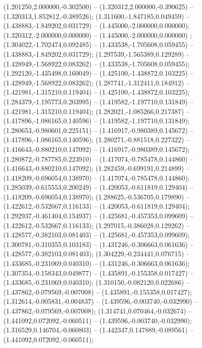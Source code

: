  (1.201250,2.000000,-0.302500) -- (1.320312,2.000000,-0.390625) -- (1.320313,1.852812,-0.389526);
 (1.311600,-1.847185,0.049459) -- (1.438883,-1.849202,0.031729) -- (1.445000,-2.000000,0.000000);
 (1.320312,-2.000000,0.000000) -- (1.445000,-2.000000,0.000000) ;
 (1.304022,-1.702474,0.092485) -- (1.433538,-1.705608,0.059455) -- (1.438883,-1.849202,0.031729);
 (1.297539,-1.565389,0.129289) -- (1.428949,-1.568922,0.083262) -- (1.433538,-1.705608,0.059455);
 (1.292120,-1.435498,0.160049) -- (1.425100,-1.438872,0.103225) -- (1.428949,-1.568922,0.083262);
 (1.287741,-1.312411,0.184912) -- (1.421981,-1.315210,0.119404) -- (1.425100,-1.438872,0.103225);
 (1.284379,-1.195773,0.203995) -- (1.419582,-1.197710,0.131849) -- (1.421981,-1.315210,0.119404);
 (1.282021,-1.085266,0.217387) -- (1.417896,-1.086165,0.140596) -- (1.419582,-1.197710,0.131849);
 (1.280653,-0.980601,0.225151) -- (1.416917,-0.980389,0.145672) -- (1.417896,-1.086165,0.140596);
 (1.280271,-0.881518,0.227322) -- (1.416643,-0.880210,0.147092) -- (1.416917,-0.980389,0.145672);
 (1.280872,-0.787785,0.223910) -- (1.417074,-0.785478,0.144860) -- (1.416643,-0.880210,0.147092);
 (1.282459,-0.699191,0.214899) -- (1.418209,-0.696054,0.138970) -- (1.417074,-0.785478,0.144860);
 (1.285039,-0.615553,0.200249) -- (1.420053,-0.611819,0.129404) -- (1.418209,-0.696054,0.138970);
 (1.288625,-0.536705,0.179890) -- (1.422612,-0.532667,0.116133) -- (1.420053,-0.611819,0.129404);
 (1.292937,-0.461404,0.154937) -- (1.425681,-0.457353,0.099609) -- (1.422612,-0.532667,0.116133);
 (1.297015,-0.386028,0.129262) -- (1.428577,-0.382103,0.081403) -- (1.425681,-0.457353,0.099609);
 (1.300781,-0.310355,0.103183) -- (1.431246,-0.306663,0.061636) -- (1.428577,-0.382103,0.081403);
 (1.304229,-0.234441,0.076715) -- (1.433685,-0.231069,0.040310) -- (1.431246,-0.306663,0.061636);
 (1.307354,-0.158343,0.049877) -- (1.435891,-0.155358,0.017427) -- (1.433685,-0.231069,0.040310);
 (1.310150,-0.082120,0.022686) -- (1.437862,-0.079569,-0.007008) -- (1.435891,-0.155358,0.017427);
 (1.312614,-0.005831,-0.004837) -- (1.439596,-0.003740,-0.032990) -- (1.437862,-0.079569,-0.007008);
 (1.314741,0.070464,-0.032674) -- (1.441092,0.072092,-0.060511) -- (1.439596,-0.003740,-0.032990);
 (1.316529,0.146704,-0.060803) -- (1.442347,0.147889,-0.089561) -- (1.441092,0.072092,-0.060511);
